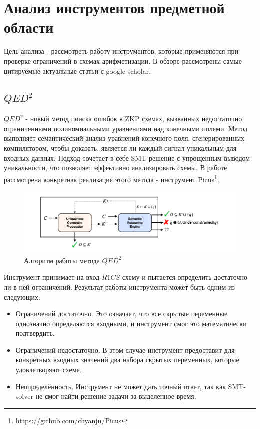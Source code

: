 \documentclass[a4paper]{article}
\begin{document}
\newpage
\section{Анализ инструментов предметной области}
\indent

Цель анализа - рассмотреть работу инструментов, которые применяются при проверке ограничений в схемах арифметизации. В обзоре рассмотрены самые цитируемые актуальные статьи с google scholar.

\subsection{$QED^2$}
\indent

$QED^2$\cite{litlink7} - новый метод поиска ошибок в ZKP схемах, вызванных недостаточно ограниченными полиномиальными уравнениями над конечными полями. Метод выполняет семантический анализ уравнений конечного поля, сгенерированных компилятором, чтобы доказать, является ли каждый сигнал уникальным для входных данных. Подход сочетает в себе SMT-решение с упрощенным выводом уникальности, что позволяет эффективно
анализировать схемы. В работе рассмотрена конкретная реализация этого метода - инструмент Picus\footnote[1]{\href{https://github.com/chyanju/Picus}{https://github.com/chyanju/Picus}}.

\begin{figure}[ht!]
\includegraphics[width=180mm]{QED_algo.png}
\caption{Алгоритм работы метода $QED^2$}
\label{QED_algo}
\end{figure}

Инструмент принимает на вход $R1CS$ схему и пытается определить достаточно ли в ней ограничений. Результат работы инструмента может быть одним из следующих:

\begin{itemize}
    \item Ограничений достаточно. Это означает, что все скрытые переменные однозначно определяются входными, и инструмент смог это математически подтвердить.
    \item Ограничений недостаточно. В этом случае инструмент предоставит для конкретных входных значений два набора скрытых переменных, которые удовлетворяют схеме.
    \item Неопределённость. Инструмент не может дать точный ответ, так как SMT-solver не смог найти решение задачи за выделенное время.
\end{itemize}
\end{document}
